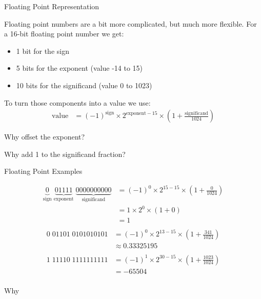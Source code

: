 \begin{frame}{Floating Point Representation}

	Floating point numbers are a bit more complicated, but much more flexible. For
	a 16-bit floating point number we get:

	\begin{itemize}
		\item 1 bit for the sign
		\item 5 bits for the exponent (value -14 to 15)
		\item 10 bits for the significand (value 0 to 1023)
	\end{itemize}

	To turn those components into a value we use:
	\begin{align*}
		\text{value} & = (-1)^{\text{sign}} \times 2^{\text{exponent} - 15} \times \left(1 + \frac{\text{significand}}{1024} \right)
	\end{align*}

	Why offset the exponent?

	Why add 1 to the significand fraction?

\end{frame}


\begin{frame}{Floating Point Examples}

	\begin{align*}
		\underbrace{0}_\text{sign} \; \underbrace{01111}_\text{exponent} \; \underbrace{0000000000}_\text{significand} & = (-1)^0 \times 2^{15 - 15} \times \left( 1 + \frac{0}{1024} \right) \\
		                                                                                                               & = 1 \times 2^0   \times \left( 1 + 0 \right)                         \\
		                                                                                                               & = 1                                                                  \\
	\end{align*}
	\begin{align*}
		0 \; 01101 \; 0101010101 & = (-1)^0 \times 2^{13 - 15} \times \left( 1 + \frac{341}{1024} \right) \\
		                         & \approx 0.33325195                                                     \\
	\end{align*}
	\begin{align*}
		1 \; 11110 \; 1111111111 & = (-1)^1 \times 2^{30 - 15} \times \left( 1 + \frac{1023}{1024} \right) \\
		                         & = -65504                                                                \\
	\end{align*}

	Why
\end{frame}


